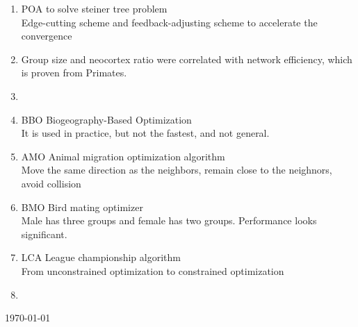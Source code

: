 \documentclass[a4paper,12pt]{article}
\begin{document}
\begin{enumerate}
	\item POA to solve steiner tree problem \cite{Liu_Physarum_2015}
	\\Edge-cutting scheme and feedback-adjusting scheme to accelerate the convergence
	
	\item Group size and neocortex ratio were correlated with network efficiency, which is proven from Primates. \cite{Pasquaretta_Social_2014}
	
	\item \cite{Patra_A_2011}
	
	\item BBO Biogeography-Based Optimization\cite{Simon_Biogeography_2008}
	\\It is used in practice, but not the fastest, and not general.
	
	\item AMO Animal migration
optimization algorithm %
	\\Move the same direction as the neighbors, remain close to the neighnors, avoid collision

 	\item BMO Bird mating optimizer\cite{Askarzadeh_Bird_2014}
 	\\Male has three groups and female has two groups. Performance looks significant.
 	
 	\item LCA League championship algorithm\cite{Kashan_An_2011}
 	\\From unconstrained optimization to constrained optimization

 	\item \cite{Kashan_An_2013}

 \cite{Gurrutxaga_SEP_2010}	
 

 
 




\end{enumerate}
\today




\end{document}
